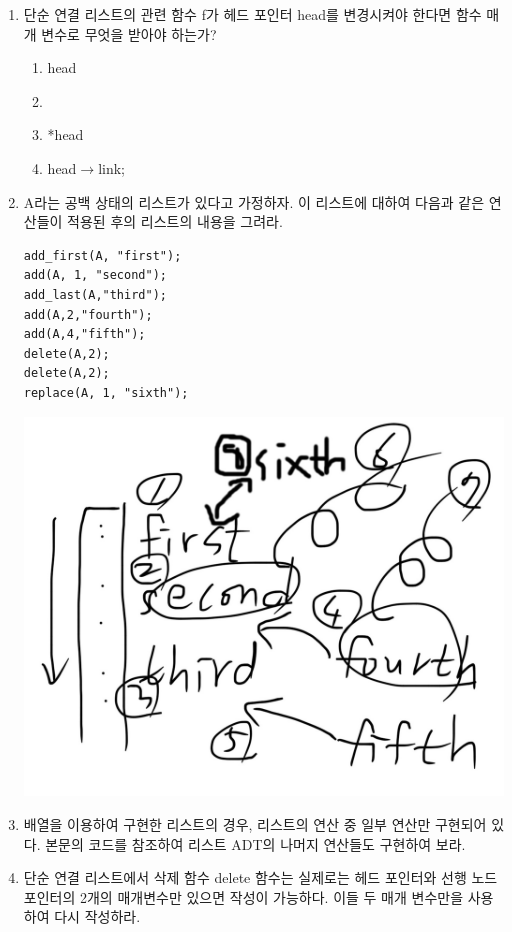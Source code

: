 \documentclass[11pt,a4paper]{article}
\begin{document}
\begin{enumerate}
\item 단순 연결 리스트의 관련 함수 f가 헤드 포인터 head를 변경시켜야 한다면 함수 매개 변수로 무엇을 받아야 하는가?
	\begin{enumerate}
		\item head
		\item {}
		\item *head
		\item head$\rightarrow$link;
	\end{enumerate}
\lstset{language=C, tabsize=4, frame=single, showstringspaces=false, breaklines=true, columns=flexible, basicstyle=\ttfamily\small}


\item A라는 공백 상태의 리스트가 있다고 가정하자. 이 리스트에 대하여 다음과 같은 연산들이 적용된 후의 리스트의 내용을 그려라.
\begin{lstlisting}[frame=none]
add_first(A, "first");
add(A, 1, "second");
add_last(A,"third");
add(A,2,"fourth");
add(A,4,"fifth");
delete(A,2);
delete(A,2);
replace(A, 1, "sixth");
\end{lstlisting}
\includegraphics[width=\textwidth]{11.jpg}


\item 배열을 이용하여 구현한 리스트의 경우, 리스트의 연산 중 일부 연산만 구현되어 있다. 본문의 코드를 참조하여 리스트 ADT의 나머지 연산들도 구현하여 보라.


\item 단순 연결 리스트에서 삭제 함수 delete 함수는 실제로는 헤드 포인터와 선행 노드 포인터의 2개의 매개변수만 있으면 작성이 가능하다. 이들 두 매개 변수만을 사용하여 다시 작성하라.



\end{enumerate}
\end{document}
